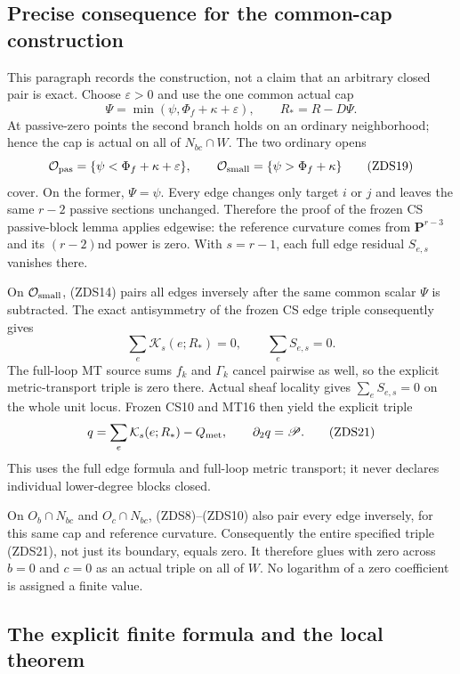 \subsection{Precise consequence for the common-cap construction}

This paragraph records the construction, not a claim that an arbitrary
closed pair is exact.  Choose $\varepsilon>0$
and use the one common actual cap
\[
 \Psi=\min(\psi,\Phi_f+\kappa+\varepsilon),\qquad
 R_*=R-D\Psi.
 \tag{ZDS18}
\]
At passive-zero points the second branch holds on an ordinary
neighborhood; hence the cap is actual on all of $N_{bc}\cap W$.
The two ordinary opens
\[
 \mathcal O_{\rm pas}=\{\psi<\Phi_f+\kappa+\varepsilon\},
 \qquad\mathcal O_{\rm small}=\{\psi>\Phi_f+\kappa\}
 \tag{ZDS19}
\]
cover.  On the former, $\Psi=\psi$.  Every edge changes only
target $i$ or $j$ and leaves the same $r-2$ passive sections
unchanged.  Therefore the proof of the frozen CS passive-block
lemma applies edgewise: the reference curvature comes from
$\mathbf P^{r-3}$ and its $(r-2)$nd power is zero.  With
$s=r-1$, each full edge residual $S_{e,s}$ vanishes there.

On $\mathcal O_{\rm small}$, (ZDS14) pairs all edges inversely
after the same common scalar $\Psi$ is subtracted.  The exact
antisymmetry of the frozen CS edge triple consequently gives
\[
 \sum_e\mathcal K_s(e;R_*)=0,\qquad
 \sum_eS_{e,s}=0.
 \tag{ZDS20}
\]
The full-loop MT source sums $f_k$ and $\Gamma_k$ cancel pairwise
as well, so the explicit metric-transport triple is zero there.
Actual sheaf locality gives $\sum_eS_{e,s}=0$ on the whole unit
locus.  Frozen CS10 and MT16 then yield the explicit triple
\[
 q=\sum_e\mathcal K_s(e;R_*)-Q_{\rm met},\qquad
                       \partial_2q=\mathscr P.
 \tag{ZDS21}
\]
This uses the full edge formula and full-loop metric transport;
it never declares individual lower-degree blocks closed.

On $O_b\cap N_{bc}$ and $O_c\cap N_{bc}$, (ZDS8)--(ZDS10)
also pair every edge inversely, for this same cap and reference
curvature.  Consequently the entire specified triple (ZDS21),
not just its boundary, equals zero.  It therefore glues with
zero across $b=0$ and $c=0$ as an actual triple on all of $W$.
No logarithm of a zero coefficient is assigned a finite value.

\subsection{The explicit finite formula and the local theorem}

